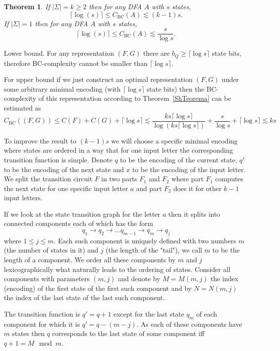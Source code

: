 \documentclass[copyright, creativecommons]{eptcs}
\newcommand{\cBC}{C_\mathrm{BC}}
\newtheorem{theorem}{Theorem}[section]
\newenvironment{proof}[1][Proof]{\begin{trivlist}
\item[\hskip \labelsep {\bfseries #1}]}{\end{trivlist}}
\begin{document}
\begin{theorem}
\label{PFrobezas}
If $|\Sigma|=k\geq 2$ then for any DFA $A$ with $s$ states, 
$$\lceil\log(s)\rceil\leq \cBC(A)\lesssim (k-1)s.$$
If $|\Sigma|=1$ then for any DFA $A$ with $s$ states, 
$$\lceil\log(s)\rceil\leq \cBC(A)\lesssim \frac{s}{\log s}.$$

\end{theorem}
\begin{proof}
Lower bound. For any representation $(F, G)$ there are $b_Q\geq \lceil\log{s}\rceil$ state bits,
therefore BC-complexity cannot be smaller than $\lceil\log{s}\rceil$.

For upper bound if we just construct an optimal representation $(F, G)$ under
some arbitrary minimal encoding (with $\lceil\log{s}\rceil$ state bits)
then the BC-complexity of this representation according to Theorem~\ref{ShTeorema} can be estimated as
$$\cBC((F, G))\leq C(F)+C(G)+\lceil\log{s}\rceil \lesssim\frac{ks\lceil\log{s}\rceil}{\log (ks\lceil\log{s}\rceil)}
+\frac{s}{\log s}+ \lceil\log{s}\rceil\lesssim ks$$

To improve the result to $(k-1)s$ we will choose a specific minimal encoding where states are ordered in
a way that for one input letter the corresponding transition function is simple.
Denote $q$ to be the encoding of the current state, $q'$ to be the encoding of the next state and $x$ to be
the encoding of the input letter.
We split the transition circuit $F$ in two parts $F_1$ and $F_2$ where part $F_1$
computes the next state for one specific input letter $a$ and part $F_2$ does it for other $k-1$ input letters.


If we look at the state transition graph for the letter $a$ then it
splits into connected components each of which has the form
$$q_1 \rightarrow q_2 \rightarrow \dots q_{m-1} \rightarrow q_m \rightarrow q_j$$
where $1\leq j \leq m$.
Each such component is uniquely defined with two numbers $m$ (the number of states in it) and $j$
(the length of the "tail"), we call $m$ to be the length of a component.
We order all these components by $m$ and $j$ lexicographically what naturally leads
to the ordering of states. Consider all components with parameters $(m, j)$ and denote by $M=M(m, j)$ the index (encoding)
of the first state of the first such component and by $N=N(m, j)$ the index of the last state of the last such component.

The transition function is $q'=q+1$ except for the last state $q_m$ of each component
for which it is $q'=q-(m-j)$. As each of these components have $m$ states then $q$
corresponds to the last state of some component iff $q+1=M \mod{m}$.


\end{proof}
\end{document}

